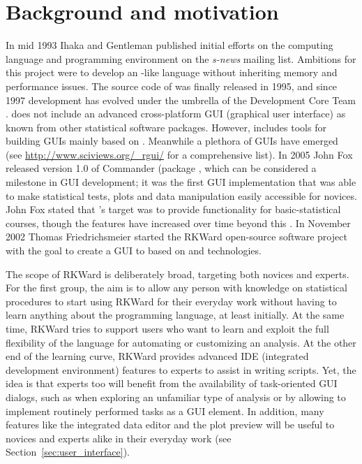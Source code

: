 \section{Background and motivation}
\label{background}
In mid 1993 Ihaka and Gentleman published initial efforts on the computing
language and programming environment  on the \emph{s-news} mailing list. Ambitions for
this project were to develop an -like language without inheriting memory
and performance issues. The source code of  was finally released in 1995, and 
since 1997 development has evolved under the umbrella of the  
Development Core Team \citep{RDCT2001, RDCT2010, Ihaka_Gentlemen_1993}.
 does not include an advanced cross-platform GUI (graphical user interface) as known from other
statistical software packages. However,  includes tools for building GUIs
mainly based on  \citep{Dalgaard2001, Dalgaard2002}. Meanwhile a
plethora of  GUIs have emerged (see \url{http://www.sciviews.org/_rgui/} for a
comprehensive list). In 2005 John Fox released version 1.0 of  Commander (package , which
can be considered a milestone in  GUI development; it was the first GUI
implementation that was able to make statistical tests,
plots and data manipulation easily accessible for  novices.
John Fox stated that 's target was to provide
functionality for basic-statistical courses, though the features have increased over
time beyond this \citep{Fox2005, Fox2007}. In November 2002 Thomas Friedrichsmeier
started the RKWard open-source software project with the goal to create a GUI to
 based on  and  technologies.

The scope of RKWard is deliberately broad, targeting both  novices and experts.
For the first group, the aim is to allow any person with knowledge on
statistical procedures to start using RKWard for their everyday work 
without having to learn anything about the  programming language,
at least initially. At the same time, RKWard tries to support users who want to learn and
exploit the full flexibility of the  language for automating or customizing
an analysis. At the other end of the learning curve, RKWard provides advanced IDE (integrated development environment)
features to  experts to assist in writing  scripts. Yet, the idea
is that  experts too will benefit from the availability of task-oriented GUI
dialogs, such as when exploring an unfamiliar type of analysis
or by allowing to implement routinely performed tasks as a GUI element. In
addition, many features like the integrated data editor and the plot preview 
will be useful to  novices and  experts alike in their everyday work
(see Section~\ref{sec:user_interface}).


